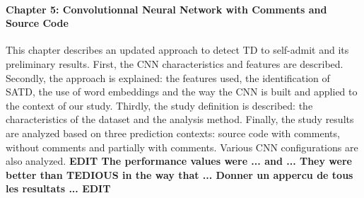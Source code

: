 \paragraph{Chapter 5: Convolutionnal Neural Network with Comments and Source Code} This chapter describes an updated approach to detect \ac{TD} to self-admit and its preliminary results. First, the \ac{CNN} characteristics and features are described. Secondly, the approach is explained: the features used, the identification of \ac{SATD}, the use of word embeddings and the way the \ac{CNN} is built and applied to the context of our study. Thirdly, the study definition is described: the characteristics of the dataset and the analysis method. Finally, the study results are analyzed based on three prediction contexts: source code with comments, without comments and partially with comments. Various \ac{CNN} configurations are also analyzed. \textbf{EDIT The performance values were ... and ... They were better than \ac{TEDIOUS} in the way that ... Donner un appercu de tous les resultats ... EDIT}









